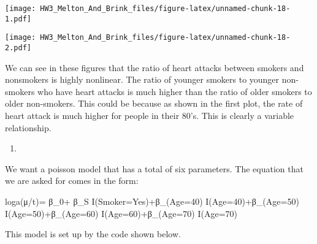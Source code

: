 \documentclass[
]{article}
\newenvironment{Shaded}{\begin{snugshade}}{\end{snugshade}}
\newcommand{\CommentTok}[1]{\textcolor[rgb]{0.56,0.35,0.01}{\textit{#1}}}
\newcommand{\DataTypeTok}[1]{\textcolor[rgb]{0.13,0.29,0.53}{#1}}
\newcommand{\KeywordTok}[1]{\textcolor[rgb]{0.13,0.29,0.53}{\textbf{#1}}}
\newcommand{\NormalTok}[1]{#1}
\newcommand{\OperatorTok}[1]{\textcolor[rgb]{0.81,0.36,0.00}{\textbf{#1}}}
\newcommand{\StringTok}[1]{\textcolor[rgb]{0.31,0.60,0.02}{#1}}
\begin{document}
\texttt{[image: HW3\_Melton\_And\_Brink\_files/figure-latex/unnamed-chunk-18-1.pdf]}

\begin{Shaded}
\end{Shaded}

\texttt{[image: HW3\_Melton\_And\_Brink\_files/figure-latex/unnamed-chunk-18-2.pdf]}

We can see in these figures that the ratio of heart attacks between
smokers and nonsmokers is highly nonlinear. The ratio of younger smokers
to younger non-smokers who have heart attacks is much higher than the
ratio of older smokers to older non-smokers. This could be because as
shown in the first plot, the rate of heart attack is much higher for
people in their 80's. This is clearly a variable relationship.

\begin{enumerate}
\def\labelenumi{\alph{enumi})}
\setcounter{enumi}{1}
\item
\end{enumerate}

We want a poisson model that has a total of six parameters. The equation
that we are asked for comes in the form:

loga(μ/t)= β\_0+ β\_S I(Smoker=Yes)+β\_(Age=40) I(Age=40)+β\_(Age=50)
I(Age=50)+β\_(Age=60) I(Age=60)+β\_(Age=70) I(Age=70)

This model is set up by the code shown below.

\begin{Shaded}
\end{Shaded}
\end{document}

